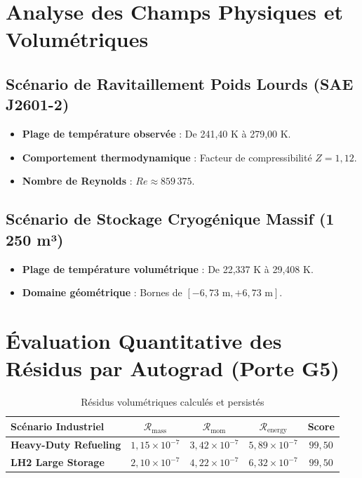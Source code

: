 \documentclass[12pt,a4paper,oneside]{report}
\begin{document}
\section{Analyse des Champs Physiques et Volumétriques}
\subsection{Scénario de Ravitaillement Poids Lourds (SAE J2601-2)}
\begin{itemize}
    \item \textbf{Plage de température observée} : De 241,40 K à 279,00 K.
    \item \textbf{Comportement thermodynamique} : Facteur de compressibilité $Z = 1,12$.
    \item \textbf{Nombre de Reynolds} : $Re \approx 859\,375$.
\end{itemize}

\subsection{Scénario de Stockage Cryogénique Massif (1 250 m³)}
\begin{itemize}
    \item \textbf{Plage de température volumétrique} : De 22,337 K à 29,408 K.
    \item \textbf{Domaine géométrique} : Bornes de $[-6,73\text{ m}, +6,73\text{ m}]$.
\end{itemize}

\section{Évaluation Quantitative des Résidus par Autograd (Porte G5)}
\begin{table}[H]
    \centering
    \caption{Résidus volumétriques calculés et persistés}
    \begin{tabular}{lcccc}
        \toprule
        Scénario Industriel & $\mathcal{R}_{\text{mass}}$ & $\mathcal{R}_{\text{mom}}$ & $\mathcal{R}_{\text{energy}}$ & Score \\
        \midrule
        \textbf{Heavy-Duty Refueling} & $1,15 \times 10^{-7}$ & $3,42 \times 10^{-7}$ & $5,89 \times 10^{-7}$ & $99,50$ \\
        \textbf{LH2 Large Storage} & $2,10 \times 10^{-7}$ & $4,22 \times 10^{-7}$ & $6,32 \times 10^{-7}$ & $99,50$ \\
        \bottomrule
    \end{tabular}
\end{table}
\end{document}
